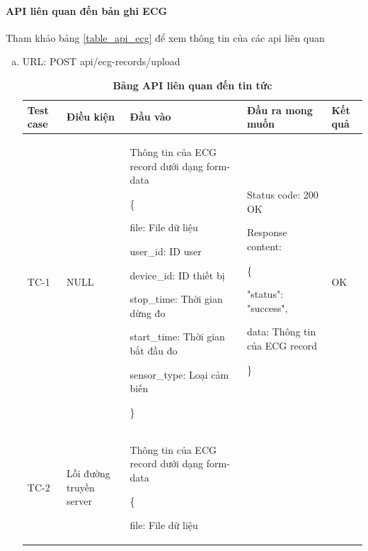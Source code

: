 \paragraph{API liên quan đến bản ghi ECG}
\mbox{}

Tham khảo bảng \ref{table_api_ecg} để xem thông tin của các api liên quan

\begin{enumerate}[a)]
  \item URL: POST api/ecg-records/upload 
  

  \begin{xltabular}{\textwidth}{
    | >{\raggedright\arraybackslash}m{1cm}
    | >{\raggedright\arraybackslash}X
    | >{\raggedright\arraybackslash}X
    | >{\raggedright\arraybackslash}X
    | >{\raggedright\arraybackslash}m{1cm}|
    }
    \caption{\bfseries \fontsize{12pt}{0pt}\selectfont Bảng API liên quan đến tin tức}
    \\
    \hline
    \bfseries Test case    &\bfseries Điều kiện   &\bfseries Đầu vào 
    &\bfseries Đầu ra mong muốn &\bfseries Kết quả\\ \hline
  
  
    TC-1
    & NULL
    & Thông tin của ECG record dưới dạng form-data

\{

file: File dữ liệu

user\_id: ID user

device\_id: ID thiết bị

stop\_time: Thời gian dừng đo

start\_time: Thời gian bắt đầu đo

sensor\_type: Loại cảm biến


\}

    & 
  
    Status code: 200 OK
  
      Response content:
  
      \{
  
    "status": "success",

    data: Thông tin của ECG record
  
    \}
    
    & OK
  
    \\ \hline
  
    TC-2
    & Lỗi đường truyền server
    & Thông tin của ECG record dưới dạng form-data

\{

file: File dữ liệu


\end{xltabular}
\end{enumerate}
